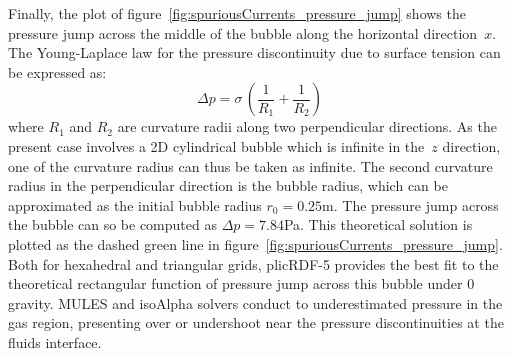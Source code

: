 \documentclass[review]{elsarticle}
\begin{document}
Finally, the plot of figure~\ref{fig:spuriousCurrents_pressure_jump} shows the pressure jump across the middle of the bubble along the horizontal direction~$x$. The Young-Laplace law for the pressure discontinuity due to surface tension can be expressed as:
\begin{equation}
  \Delta p = \sigma \, \left( \frac{1}{R_1} + \frac{1}{R_2} \right)
  \label{eqnYoungLaplace}
\end{equation}
where $R_1$ and $R_2$ are curvature radii along two perpendicular directions. As the present case involves a 2D cylindrical bubble which is infinite in the~$z$ direction, one of the curvature radius can thus be taken as infinite. The second curvature radius in the perpendicular direction is the bubble radius, which can be approximated as the initial bubble radius $r_0=0.25$m. The pressure jump across the bubble can so be computed as $\Delta p=7.84$Pa. This theoretical solution is plotted as the dashed green line in figure~\ref{fig:spuriousCurrents_pressure_jump}. Both for hexahedral and triangular grids, plicRDF-5 provides the best fit to the theoretical rectangular function of pressure jump across this bubble under 0 gravity. MULES and isoAlpha solvers conduct to underestimated pressure in the gas region, presenting over or undershoot near the pressure discontinuities at the fluids interface.
\end{document}
